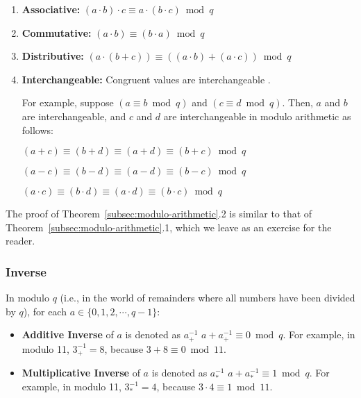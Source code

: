 \begin{tcolorbox}[title={\textbf{\tboxtheorem{\ref*{subsec:modulo-arithmetic}.2} Properties of Modulo Arithmetic}}]

\begin{enumerate}
\item \textbf{Associative:} $(a \cdot b) \cdot c \equiv a \cdot (b \cdot c) \bmod q$

\item \textbf{Commutative:} $(a \cdot b) \equiv (b \cdot a) \bmod q$

\item \textbf{Distributive:} $(a \cdot (b + c)) \equiv ((a \cdot b) + (a \cdot c))  \bmod q$

\item \textbf{Interchangeable:} Congruent values are interchangeable . 

For example, suppose $(a \equiv b \bmod q)$ and $(c \equiv d \bmod q)$. Then, $a$ and $b$ are interchangeable, and $c$ and $d$ are interchangeable in modulo arithmetic as follows:

$(a + c) \equiv (b + d) \equiv (a + d) \equiv (b + c) \bmod q$

$(a - c) \equiv (b - d) \equiv (a - d) \equiv (b - c) \bmod q$

$(a \cdot c) \equiv (b \cdot d) \equiv (a \cdot d) \equiv (b \cdot c) \bmod q$

\end{enumerate}

\end{tcolorbox}

The proof of Theorem~\ref*{subsec:modulo-arithmetic}.2 is similar to that of Theorem~\ref*{subsec:modulo-arithmetic}.1, which we leave as an exercise for the reader. 


\subsubsection{Inverse}
\label{subsec:modulo-inverse}

\begin{tcolorbox}[title={\textbf{\tboxdef{\ref*{subsec:modulo-inverse}} Inverse in Modulo Arithmetic}}]

In modulo $q$ (i.e., in the world of remainders where all numbers have been divided by $q$), for each $a \in \{0, 1, 2, \cdots, q-1\}$:

\begin{itemize}

\item \textbf{Additive Inverse} of $a$ is denoted as $a_+^{-1}$  $a + a_+^{-1} \equiv 0 \bmod q$. For example, in modulo 11, $3_+^{-1} = 8$, because $3 + 8 \equiv 0 \bmod 11$.

\item \textbf{Multiplicative Inverse} of $a$ is denoted as $a_*^{-1}$  $a + a_*^{-1} \equiv 1 \bmod q$. For example, in modulo 11, $3_*^{-1} = 4$, because $3 \cdot 4 \equiv 1 \bmod 11$.

\end{itemize}

\end{tcolorbox}

